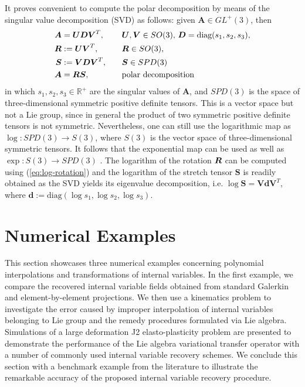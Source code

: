 \documentclass[12pt]{article}
\newcommand{\mbs}[1]{\boldsymbol{#1}}
\newcommand{\mbb}[1]{\mathbb{#1}}
\def\bA{{\mbs{A}}} \def\bB{{\mbs{B}}} \def\bC{{\mbs{C}}}
\def\bD{{\mbs{D}}} \def\bE{{\mbs{E}}} \def\bF{{\mbs{F}}}
\def\bS{{\mbs{S}}} \def\bT{{\mbs{T}}} \def\bU{{\mbs{U}}}
\def\bV{{\mbs{V}}} \def\bW{{\mbs{W}}} \def\bX{{\mbs{X}}}
\def\bd{{\mbs{d}}} \def\be{{\mbs{e}}} \def\fb{{\mbs{f}}}
\begin{document}
It proves convenient to compute the polar decomposition by means of
the singular value decomposition (SVD) as follows: given $\bA \in
GL^+(3)$, then
\begin{align}
  \bA & = \bU \bD \bV^T, & \quad & \bU, \bV \in SO(3), \,
  \bD = \text{diag}(s_1,s_2,s_3), \label{eq:SVD-polar-1}
  \\
  \bR & := \bU \bV^T, & \quad & \bR \in SO(3),
  \\
  \bS & := \bV \bD \bV^T, & \quad & \bS \in SPD(3)
  \\
  \bA & = \bR \bS, & \quad
  & \text{polar decomposition} \label{eq:SVD-polar-4}
\end{align}
in which $s_1,s_2,s_3 \in \mbb{R}^+$ are the singular values of $\bA$,
and $SPD(3)$ is the space of three-dimensional symmetric positive
definite tensors. This is a vector space but not a Lie group, since in
general the product of two symmetric positive definite tensors is not
symmetric. Nevertheless, one can still use the logarithmic map as
$\log: SPD(3) \rightarrow S(3)$, where $S(3)$ is the vector space of
three-dimensional symmetric tensors. It follows that the exponential
map can be used as well as $\exp: S(3) \rightarrow SPD(3)$
\citep{Gallier:2011}. The logarithm of the rotation $\bR$ can be
computed using (\ref{eq:log-rotation}) and the logarithm of the
stretch tensor $\bS$ is readily obtained as the SVD yields its
eigenvalue decomposition, i.e. $\log \bS = \bV \bd \bV^T$, where $\bd
:= \text{diag}(\log s_1, \log s_2, \log s_3)$.

\section{Numerical Examples}
This section showcases three numerical examples concerning polynomial
interpolations and transformations of internal variables. In the first
example, we compare the recovered internal variable fields obtained
from standard Galerkin and element-by-element projections. We then use a
kinematics problem to investigate the error caused by improper
interpolation of internal variables belonging to Lie group and the
remedy procedures formulated via Lie algebra. Simulations of a large
deformation J2 elasto-plasticity problem are presented to demonstrate 
the performance of the Lie algebra variational transfer operator  with a 
number of commonly used  internal variable recovery schemes. 
We conclude this section with a benchmark
example from the literature to illustrate the remarkable accuracy of
the proposed internal variable recovery procedure.
\end{document}
